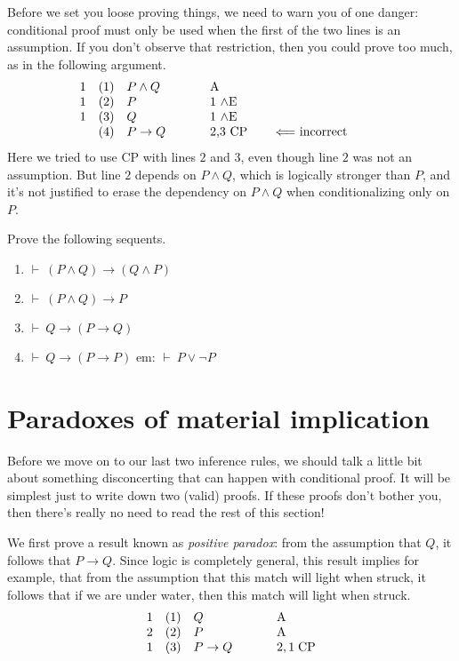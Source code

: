 Before we set you loose proving things, we need to warn you of one
danger: conditional proof must only be used when the first of the two
lines is an assumption.  If you don't observe that restriction, then
you could prove too much, as in the following argument.
\[ \begin{array}{l l >{$}p{2cm}<{$} p{1.5cm} p{3cm}}
     1 & (1) & P\wedge Q  & A \\
     1 & (2) & P  & 1 $\wedge$E \\
     1 & (3) & Q &  1 $\wedge$E \\
       & (4) & P\to Q & 2,3 CP &
                                 $\Longleftarrow$
                                 incorrect \end{array} \] Here we
tried to use CP with lines $2$ and $3$, even though line $2$ was not an assumption.  But line $2$ depends on $P\wedge Q$, which is logically stronger than $P$, and it's not justified to erase the dependency on $P\wedge Q$ when conditionalizing only on $P$.

\begin{exercises} Prove the following sequents.
  \begin{enumerate}
  \item $\vdash\:(P\wedge Q)\to (Q\wedge P)$  
  \item $\vdash\:(P\wedge Q)\to P$  
  \item $\vdash\:Q\to (P\to Q)$
  \item $\vdash\:Q\to (P\to P)$
  \sitem \gls{em}: $\vdash \:P\vee \neg P$
  \end{enumerate}
\end{exercises}






\section{Paradoxes of material implication} 

Before we move on to our last two inference rules, we should talk a
little bit about something disconcerting that can happen with
conditional proof.  It will be simplest just to write down two (valid)
proofs.  If these proofs don't bother you, then there's really no need
to read the rest of this section!

We first prove a result known as \emph{positive paradox}: from the
assumption that $Q$, it follows that $P\to Q$.  Since logic is
completely general, this result implies for example, that from the
assumption that this match will light when struck, it follows that if
we are under water, then this match will light when struck.  
\[ \begin{array}{l l >{$}p{2cm}<{$} l}
  1 & (1) & Q & \mathrm{A} \\
  2 & (2) & P & \mathrm{A} \\
     1 & (3) & P\to Q & 2,1 \;\mathrm{CP} \end{array} \]

